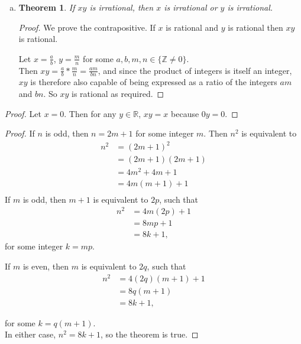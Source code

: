 \documentclass[12pt]{scrartcl} %
\newtheorem*{theorem}{Theorem}
\begin{document}
\begin{enumerate}[(a)]
\item \begin{theorem}
If $xy$ is irrational, then $x$ is irrational or $y$ is irrational.
\end{theorem}
\begin{proof}
We prove the contrapositive. If $x$ is rational and $y$ is rational then $xy$ is rational.

Let $x = \frac{a}{b}$, $y=\frac{m}{n}$ for some $a, b, m, n \in \{\mathbb{Z} \neq 0\}$.\\
Then $xy = \frac{a}{b} * \frac{m}{n} = \frac{am}{bn}$, and since the product of integers is itself an integer, $xy$ is therefore also capable of being expressed as a ratio of the integers $am$ and $bn$. So $xy$ is rational as required.
\end{proof}
\end{enumerate}
\begin{proof}
Let $x=0$. Then for any $y \in \mathbb{R}$, $xy = x$ because $0y = 0$.
\end{proof}
\begin{proof}
If $n$ is odd, then $n=2m + 1$ for some integer $m$. Then $n^2$ is equivalent to \begin{align}
n^2 &= (2m + 1)^2\\
&= (2m + 1)(2m + 1)\\
&= 4m^2 + 4m + 1\\
&= 4m(m + 1) + 1\\
\end{align}
If $m$ is odd, then $m + 1$ is equivalent to $2p$, such that
\begin{align}
n^2 &= 4m(2p) + 1\\
&= 8mp + 1\\
&= 8k + 1,
\end{align}
for some integer $k=mp$.

If $m$ is even, then $m$ is equivalent to $2q$, such that
\begin{align}
n^2 &= 4(2q)(m + 1) + 1\\
&= 8q(m+1)\\
&= 8k + 1,
\end{align}

for some $k = q(m + 1)$.\\
In either case, $n^2 = 8k + 1$, so the theorem is true.
\end{proof}
\end{document}
